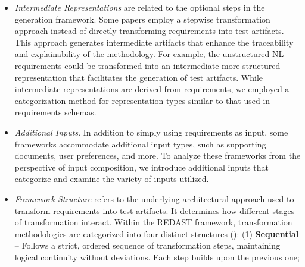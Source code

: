 \begin{itemize}
    \item \emph{Intermediate Representations} are related to the optional steps in the generation framework. Some papers employ a stepwise transformation approach instead of directly transforming requirements into test artifacts. This approach generates intermediate artifacts that enhance the traceability and explainability of the methodology. For example, the unstructured NL requirements could be transformed into an intermediate more structured representation that facilitates the generation of test artifacts. While intermediate representations are derived from requirements, we employed a categorization method for representation types similar to that used in requirements schemas. %
    \item \emph{Additional Inputs}. In addition to simply using requirements as input, some frameworks accommodate additional input types, such as supporting documents, user preferences, and more. To analyze these frameworks from the perspective of input composition, we introduce additional inputs that categorize and examine the variety of inputs utilized. 
    \item \emph{Framework Structure} refers to the underlying architectural approach used to transform requirements into test artifacts. It determines how different stages of transformation interact. Within the REDAST framework, transformation methodologies are categorized into four distinct structures (\cite{framework_structure_01,framework_structure_02}): (1) \textbf{Sequential} – Follows a strict, ordered sequence of transformation steps, maintaining logical continuity without deviations. Each step builds upon the previous one;

\end{itemize}
